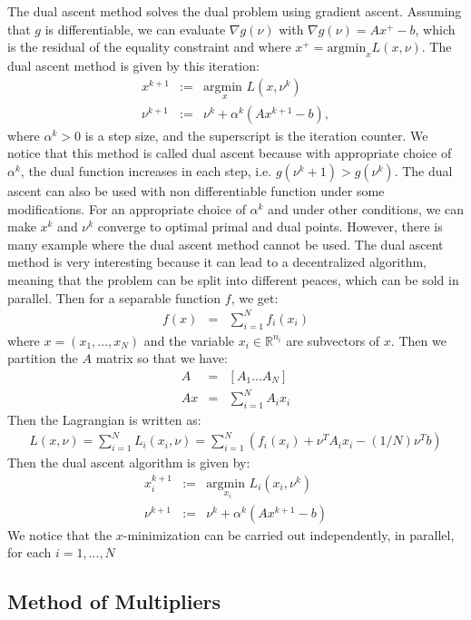 \documentclass{article}
\begin{document}
The dual ascent method solves the dual problem using gradient ascent. Assuming that $g$ is differentiable, we can evaluate $\nabla g(\nu)$ with $\nabla g(\nu) = Ax^+ - b$, which is the residual of the equality constraint and where $x^+ = \text{argmin}_x L(x, \nu)$. The dual ascent method is given by this iteration:
\begin{eqnarray*}
x^{k+1} &:=& \underset{x}{\text{argmin }} L(x, \nu^k) \\
\nu^{k+1} &:=& \nu^k + \alpha^k (A x^{k+1} - b),
\end{eqnarray*}
where $\alpha^k > 0$ is a step size, and the superscript is the iteration counter. We notice that this method is called dual ascent because with appropriate choice of $\alpha^k$, the dual function increases in each step, i.e. $g(\nu^k+1) > g(\nu^k)$. The dual ascent can also be used with non differentiable function under some modifications.
For an appropriate choice of $\alpha^k$ and under other conditions, we can make $x^k$ and $\nu^k$ converge to optimal primal and dual points. However, there is many example where the dual ascent method cannot be used.
The dual ascent method is very interesting because it can lead to a decentralized algorithm, meaning that the problem can be split into different peaces, which can be sold in parallel. Then for a separable function $f$, we get:
\begin{eqnarray*}
f(x) &=& \sum\limits_{i=1}^N f_i(x_i)
\end{eqnarray*}
where $x = (x_1,...,x_N)$ and the variable $x_i \in \mathbb{R}^{n_i}$ are subvectors of $x$. Then we partition the $A$ matrix so that we have:
\begin{eqnarray*}
A &=& [A_1 ... A_N] \\
Ax &=& \sum\limits_{i=1}^N A_ix_i
\end{eqnarray*}
Then the Lagrangian is written as:
\begin{eqnarray*}
L(x, \nu) = \sum\limits_{i=1}^N L_i(x_i, \nu) = \sum\limits_{i=1}^N (f_i(x_i) + \nu^TA_ix_i - (1/N)\nu^Tb)
\end{eqnarray*}
Then the dual ascent algorithm is given by:
\begin{eqnarray*}
x_i^{k+1} &:=& \underset{x_i}{\text{argmin }} L_i(x_i, \nu^k)\\
\nu^{k+1} &:=& \nu^k + \alpha^k(Ax^{k+1} - b)
\end{eqnarray*}
We notice that the $x$-minimization can be carried out independently, in parallel, for each $i=1,...,N$

\subsection{Method of Multipliers}
	\label{Method of Multipliers}
	
\end{document}
